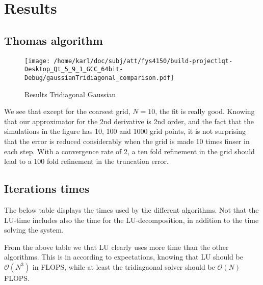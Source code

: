 \documentclass{article}
\begin{document}
\section{Results}

\subsection{Thomas algorithm}

\begin{figure}[H]
	\centering
	\texttt{[image: /home/karl/doc/subj/att/fys4150/build-project1qt-Desktop\_Qt\_5\_9\_1\_GCC\_64bit-Debug/gaussianTridiagonal\_comparison.pdf]}
	\caption{Results Tridiagonal Gaussian}
\end{figure}

We see that except for the coarsest grid, $N=10$, the fit is really good. Knowing that our approximator for the 2nd derivative is 2nd order, and the fact that the simulations in the figure has 10, 100 and 1000 grid points, it is not surprising that the error is reduced considerably when the grid is made 10 times finser in each step. With a convergence rate of 2, a ten fold refinement in the grid should lead to a 100 fold refinement in the truncation error.

\subsection{Iterations times}
The below table displays the times used by the different algorithms. Not that the LU-time includes also the time for the LU-decomposition, in addition to the time solving the system.

\begin{minipage}{.32\textwidth} %
	
\end{minipage}\hfill
\begin{minipage}{.32\textwidth}
	
\end{minipage}\hfill
\begin{minipage}{.32\textwidth}
	
\end{minipage}\hfill

From the above table we that LU clearly uses more time than the other algorithms. This is in according to expectations, knowing that LU should be $\mathcal{O}(N^3)$ in FLOPS, while at least the tridiagaonal solver should be $\mathcal{O}(N)$ FLOPS.\\
\end{document}
